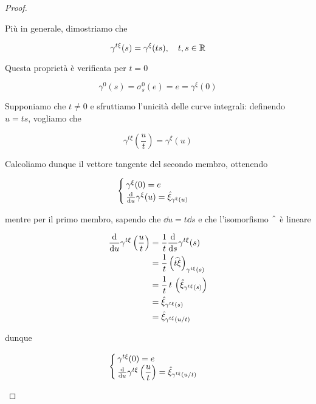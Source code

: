 \begin{proof}
\begin{enumerate}
		Più in generale, dimostriamo che
		
		\begin{equation}
			\gamma^{t \xi}(s) = \gamma^{\xi}(t s) \qcomma t,s \in \R
		\end{equation}
	
		Questa proprietà è verificata per $ t=0 $
		
		\begin{equation}
			\gamma^{0}(s) = \sigma_{s}^{0}(e) = e = \gamma^{\xi}(0)
		\end{equation}
	
		Supponiamo che $ t \neq 0 $ e sfruttiamo l'unicità delle curve integrali: definendo $ u = t s $, vogliamo che
		
		\begin{equation}
			\gamma^{t \xi} \left( \dfrac{u}{t} \right) = \gamma^{\xi}(u)
		\end{equation}
		
		Calcoliamo dunque il vettore tangente del secondo membro, ottenendo
		
		\begin{equation}
			\begin{cases}
				\gamma^{\xi}(0) = e\\
				\dv{u} \gamma^{\xi}(u) = \hat{\xi}_{\gamma^{\xi}(u)}
			\end{cases}
		\end{equation}
	
		mentre per il primo membro, sapendo che $ \dd{u} = t \dd{s} $ e che l'isomorfismo $ \; \hat{} \; $ è lineare
		
		\begin{align}
			\begin{split}
				\dv{u} \gamma^{t \xi} \left( \dfrac{u}{t} \right) &= \dfrac{1}{t} \dv{s} \gamma^{t \xi}(s)\\
				&= \dfrac{1}{t} \left( \widehat{t \xi} \right)_{\gamma^{t \xi}(s)}\\
				&= \dfrac{1}{t} \, t \, \left( \hat{\xi}_{\gamma^{t \xi}(s)} \right)\\
				&= \hat{\xi}_{\gamma^{t \xi}(s)}\\
				&= \hat{\xi}_{\gamma^{t \xi}(u/t)}
			\end{split}
		\end{align}
	
		dunque
		
		\begin{equation}
			\begin{cases}
				\gamma^{t \xi}(0) = e\\
				\dv{u} \gamma^{t \xi} \left( \dfrac{u}{t} \right) = \hat{\xi}_{\gamma^{t \xi}(u/t)}
			\end{cases}
		\end{equation}
	

\end{enumerate}
\end{proof}
